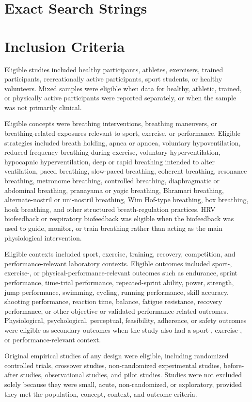 \documentclass[12pt,a4paper]{article}
\begin{document}
\section{Exact Search Strings}


\section{Inclusion Criteria}
Eligible studies included healthy participants, athletes, exercisers, trained participants, recreationally active participants, sport students, or healthy volunteers. Mixed samples were eligible when data for healthy, athletic, trained, or physically active participants were reported separately, or when the sample was not primarily clinical.

Eligible concepts were breathing interventions, breathing maneuvers, or breathing-related exposures relevant to sport, exercise, or performance. Eligible strategies included breath holding, apnea or apnoea, voluntary hypoventilation, reduced-frequency breathing during exercise, voluntary hyperventilation, hypocapnic hyperventilation, deep or rapid breathing intended to alter ventilation, paced breathing, slow-paced breathing, coherent breathing, resonance breathing, metronome breathing, controlled breathing, diaphragmatic or abdominal breathing, pranayama or yogic breathing, Bhramari breathing, alternate-nostril or uni-nostril breathing, Wim Hof-type breathing, box breathing, hook breathing, and other structured breath-regulation practices. HRV biofeedback or respiratory biofeedback was eligible when the biofeedback was used to guide, monitor, or train breathing rather than acting as the main physiological intervention.

Eligible contexts included sport, exercise, training, recovery, competition, and performance-relevant laboratory contexts. Eligible outcomes included sport-, exercise-, or physical-performance-relevant outcomes such as endurance, sprint performance, time-trial performance, repeated-sprint ability, power, strength, jump performance, swimming, cycling, running performance, skill accuracy, shooting performance, reaction time, balance, fatigue resistance, recovery performance, or other objective or validated performance-related outcomes. Physiological, psychological, perceptual, feasibility, adherence, or safety outcomes were eligible as secondary outcomes when the study also had a sport-, exercise-, or performance-relevant context.

Original empirical studies of any design were eligible, including randomized controlled trials, crossover studies, non-randomized experimental studies, before-after studies, observational studies, and pilot studies. Studies were not excluded solely because they were small, acute, non-randomized, or exploratory, provided they met the population, concept, context, and outcome criteria.
\end{document}
